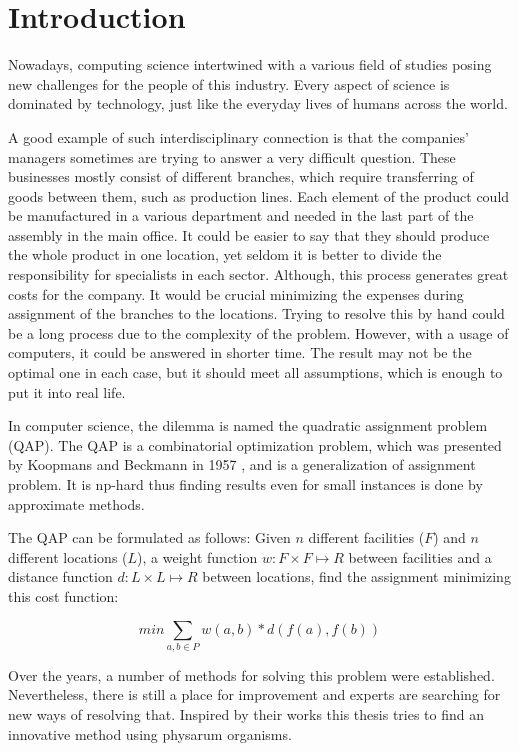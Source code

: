 \chapter{Introduction}
\label{chapter:introduction}

Nowadays, computing science intertwined with a various field of studies posing new challenges for the people of this industry.  Every aspect of science is dominated by technology, just like the everyday lives of humans across the world.

A good example of such interdisciplinary connection is that the companies' managers sometimes are trying to answer a very difficult question. These businesses mostly consist of different branches, which require transferring of goods between them, such as production lines. Each element of the product could be manufactured in a various department and needed in the last part of the assembly in the main office. It could be easier to say that they should produce the whole product in one location, yet seldom it is better to divide the responsibility for specialists in each sector. Although, this process generates great costs for the company. It would be crucial minimizing the expenses during assignment of the branches to the locations. Trying to resolve this by hand could be a long process due to the complexity of the problem. However, with a usage of computers, it could be answered in shorter time. The result may not be the optimal one in each case, but it should meet all assumptions, which is enough to put it into real life.

In computer science, the dilemma is named the quadratic assignment problem (QAP).  The QAP is a combinatorial optimization problem, which was presented by Koopmans and Beckmann in 1957 \cite{koopmans-beckmann1957}, and is a generalization of assignment problem. It is np-hard thus finding results even for small instances is done by approximate methods.

The QAP can be formulated as follows: Given $ n $ different facilities ($F$) and $ n $ different locations ($L$), a weight function $ w: F \times F \mapsto R $ between facilities and a distance function $ d: L \times L \mapsto R $ between locations, find the assignment minimizing this cost function:

\begin{equation}
min \sum_{a, b \in P } w(a, b) * d( f(a), f(b))
\end{equation}

Over the years, a number of methods for solving this problem were established. Nevertheless, there is still a place for improvement and experts are searching for new ways of resolving that. Inspired by their works this thesis tries to find an innovative method using physarum organisms.

